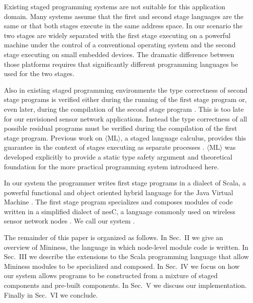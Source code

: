 Existing staged programming systems are not suitable for this
application domain. Many systems assume that the first and second
stage languages are the same or that both stages execute in the same
address space. In our scenario the two stages are widely separated
with the first stage executing on a powerful machine under the control
of a conventional operating system and the second stage executing on
small embedded devices. The dramatic difference between those
platforms requires that significantly different programming languages
be used for the two stages.

Also in existing staged programming environments the type correctness
of second stage programs is verified either during the running of the
first stage program or, even later, during the compilation of the
second stage program \cite{Mainland-Flask-2008}. This is too late for
our envisioned sensor network applications. Instead the type
correctness of all possible residual programs must be verified during
the compilation of the first stage program. Previous work on $\langle
\text{ML} \rangle$, a staged language calculus, provides this
guarantee in the context of stages executing as separate processes
\cite{FramedML}. $\langle \text{ML} \rangle$ was developed explicitly
to provide a static type safety argument and theoretical foundation
for the more practical programming system introduced here.

In our system the programmer writes first stage programs in a dialect
of Scala, a powerful functional and object oriented hybrid language
for the Java Virtual Machine \cite{PiS2}. The first stage program
specializes and composes modules of code written in a simplified
dialect of nesC, a language commonly used on wireless sensor network
nodes \cite{Gay-nesC-2003}. We call our system .

The remainder of this paper is organized as follows. In Sec.~II we
give an overview of Mininess, the language in which node-level module
code is written. In Sec.~III we describe the extensions to the Scala
programming language that allow Mininess modules to be specialized and
composed. In Sec.~IV we focus on how our system allows programs to be
constructed from a mixture of staged components and pre-built
components. In Sec.~V we discuss our implementation. Finally in
Sec.~VI we conclude.
